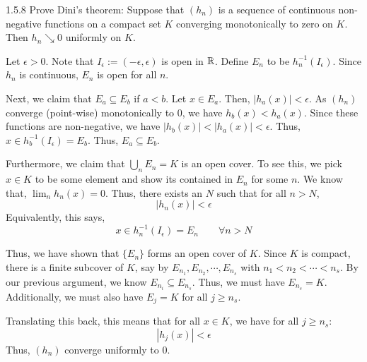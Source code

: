 \documentclass[12pt]{amsart}
\begin{document}
\begin{problem}{1.5.8}
    Prove Dini's theorem: Suppose that $(h_n)$ is a sequence of continuous non-negative functions on a compact set $K$ converging monotonically to zero on $K$. Then $h_n \searrow 0$ uniformly on $K$. 
\end{problem}
\begin{solution}
    Let $\epsilon > 0$. Note that $I_\epsilon := (-\epsilon, \epsilon)$ is open in $\mathbb R$. Define $E_n$ to be $h_n^{-1}(I_{\epsilon})$. Since $h_n$ is continuous, $E_n$ is open for all $n$. 
    
    Next, we claim that $E_a \subseteq E_b$ if $a < b$. Let $x \in E_a$. Then, $|h_a(x)| < \epsilon$. As $(h_n)$ converge (point-wise) monotonically to $0$, we have $h_b(x) < h_a(x)$. Since these functions are non-negative, we have $|h_b(x)| < |h_a(x)| < \epsilon$. Thus, $x \in h_b^{-1}(I_\epsilon) = E_b$. Thus, $E_a \subseteq E_b$.   
    
    Furthermore, we claim that $\bigcup_{n} E_n = K$ is an open cover. To see this, we pick $x \in K$ to be some element and show its contained in $E_n$ for some $n$. We know that, $\lim_n h_n(x) = 0$. Thus, there exists an $N$ such that for all $n > N$,
    \[ |h_n(x)| < \epsilon \]
    Equivalently, this says,
    \[ x \in h_n^{-1}(I_\epsilon) = E_n \qquad \forall n > N \]

    Thus, we have shown that $\{E_n\}$ forms an open cover of $K$. Since $K$ is compact, there is a finite subcover of $K$, say by $E_{n_1}, E_{n_2}, \cdots, E_{n_s}$ with $n_1 < n_2 < \cdots < n_s$. By our previous argument, we know $E_{n_i} \subseteq E_{n_s}$. Thus, we must have $E_{n_s} = K$. Additionally, we must also have $E_{j} = K$ for all $j \geq n_s$.  

    Translating this back, this means that for all $x \in K$, we have for all $j \geq n_s$:
    \[ |h_j(x)| < \epsilon \]
    Thus, $(h_n)$ converge uniformly to $0$. 
\end{solution}
\newpage 
\end{document}
